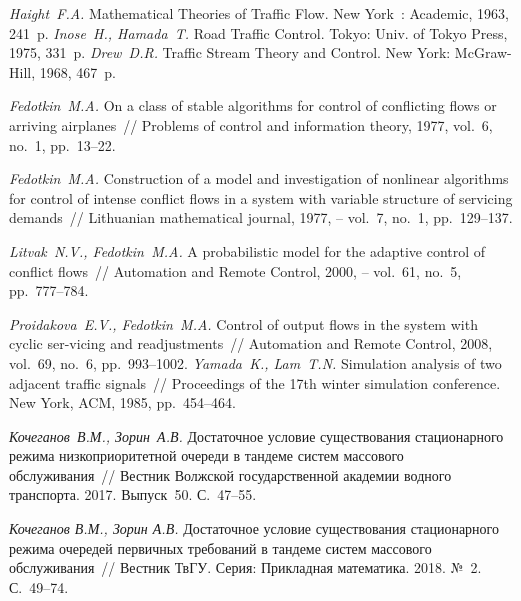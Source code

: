 \documentclass[12pt]{book}
\theoremstyle{plain}
\theoremstyle{remark}
\theoremstyle{plain}
\theoremstyle{definition}
\begin{document}
\begin{Rtwocolbib}%

 \textit{Haight~F.A.} Mathematical Theories of Traffic Flow. New York~: Academic, 1963, 241~p. 
 \textit{Inose~H., Hamada~T.} Road Traffic Control. Tokyo: Univ. of Tokyo Press, 1975, 331~p.
 \textit{Drew~D.R.} Traffic Stream Theory and Control. New York: McGraw-Hill, 1968, 467~p.


\textit{Fedotkin~M.A.} On a class of stable algorithms for control of conflicting flows or arriving airplanes~// Problems of control and information theory, 1977, vol.~6, no.~1, pp.~13--22.

\textit{Fedotkin~M.A.} Construction of a model and investigation of nonlinear algorithms for control of intense conflict flows in a system with variable structure of servicing demands~// Lithuanian mathematical journal, 1977, – vol.~7, no.~1, pp.~129--137.

\textit{Litvak~N.V., Fedotkin~M.A.} A probabilistic model for the adaptive control of conflict flows~// Automation and Remote Control, 2000, – vol.~61, no.~5, pp.~777–784.

\textit{Proidakova~E.V., Fedotkin~M.A.} Control of output flows in the system with cyclic ser-vicing and readjustments~// Automation and Remote Control, 2008, vol.~69, no.~6, pp.~993--1002.
\textit{Yamada~K., Lam~T.N.} Simulation analysis of two adjacent traffic signals~// Proceedings of the 17th winter simulation conference. New York, ACM, 1985, pp.~454--464.

\textit{Кочеганов~В.М., Зорин~А.В.} Достаточное условие существования стационарного режима низкоприоритетной очереди в тандеме систем массового обслуживания~// Вестник Волжской государственной академии водного транспорта. 2017. Выпуск~50. С.~47--55.

\textit{Кочеганов В.М., Зорин А.В.} Достаточное условие существования стационарного режима очередей первичных требований в тандеме систем массового обслуживания~// Вестник ТвГУ. Серия: Прикладная математика. 2018. №~2. С.~49--74.

\end{Rtwocolbib}%
\end{document}

